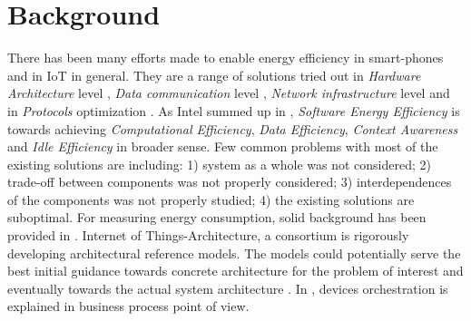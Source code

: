 \chapter{Background}
There has been many efforts made to enable energy efficiency in smart-phones and in IoT in general. They are a range of solutions tried out in \emph{Hardware Architecture} level \cite{EE:MCCarch,EE:JVM}, \emph{Data communication} level \cite{EE:eTime,EE:Multinets},  \emph{Network infrastructure} level \cite{EE:Hier} and in \emph{Protocols} optimization \cite{EE:Protocol}. As Intel summed up in \cite{EE:GreenSW}, \emph{Software Energy Efficiency} is towards achieving \emph{Computational Efficiency}, \emph{Data Efficiency}, \emph{Context Awareness} and \emph{Idle Efficiency} in broader sense. Few common problems with most of the existing solutions are including: 1) system as a whole was not considered;
2) trade-off between components was not properly considered;
3) interdependences of the components was not properly studied;
4) the existing solutions are suboptimal. For measuring energy consumption, solid background has been provided  in \cite{EE:Measure}. Internet of Things-Architecture, a consortium is rigorously developing architectural reference models. The models could potentially serve the best initial  guidance towards concrete architecture for the problem of interest and eventually towards the actual system architecture \cite{IoTA:ARM}. In \cite{Orches:Arch}, devices orchestration is explained in business process point of view.




